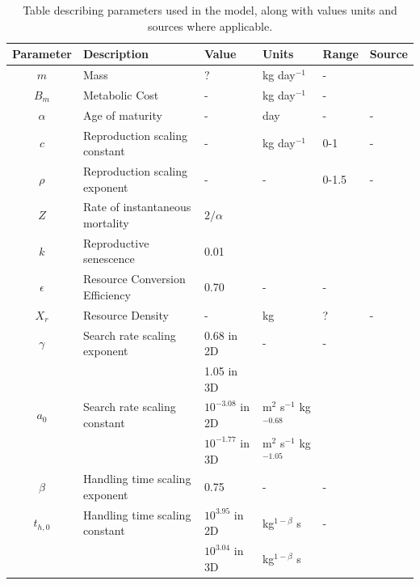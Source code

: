 \documentclass[a4paper, hidelinks]{article} %
\begin{document}
	\begin{centering}

		{}
			
		\begin{table}[h!]
			\label{parameters}
			\caption{Table describing parameters used in the model, along with values units and sources where applicable.}
			\begin{tabular}{c l l l l l}
				\hline
				Parameter 	& Description 			& Value 	& Units 	& Range 		& Source \\
				\hline
				$m$			& Mass					& ?			& kg day$^{-1}$& -			&		\\
				
				$B_m$		& Metabolic Cost		& -			& kg day$^{-1}$& - 			& \cite{Peters1983}\\
				
				$\alpha$	& Age of maturity		& -     	& day		& -				& -\\
				$c$			& Reproduction scaling constant & - & kg day$^{-1}$& 0-1 			& -\\
				$\rho$		& Reproduction scaling exponent	& -	&	-		& 0-1.5			& -\\
				$Z$			& Rate of instantaneous mortality& $2/\alpha$	& & & \cite{Charnov2001}\\
				$k$			& Reproductive senescence & 0.01\\
				
				$\epsilon$	& Resource Conversion Efficiency & 0.70 & - & - 		& \cite{Peters1983} \\
				$X_r$ 		& Resource Density		& -		& kg		& ?				& -\\
				$\gamma$	& Search rate scaling exponent & 0.68 in 2D	& - & - & \cite{Pawar2012} \\
							&						& 1.05 in 3D\\
				$a_0$		& Search rate scaling constant & $10^{-3.08}$ in 2D & m$^2$ s$^{-1}$ kg$^{-0.68}$   & &\cite{Pawar2012}	\\
							&						& $10^{-1.77}$ in 3D& m$^2$ s$^{-1}$ kg$^{-1.05} $\\
				$\beta$		& Handling time scaling exponent& 0.75 & - & - & \cite{Pawar2012}\\
				$t_{h, 0}$	& Handling time scaling constant& $10^{3.95}$ in 2D &kg$^{1-\beta}$ s& -& \cite{Pawar2012}	\\
							&						& $10^{3.04}$ in 3D			&kg$^{1-\beta}$ s\\
				\hline
			\end{tabular}
		\end{table}
	\end{centering}
\end{document}
